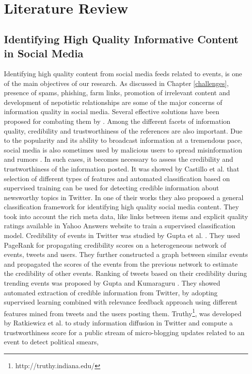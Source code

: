 
\chapter{Literature Review} %
\thispagestyle{fancy}
\label{review} %

\doublespacing
\setlength{\parindent}{1cm}
\section{Identifying High Quality Informative Content in Social Media}
Identifying high quality content from social media feeds related to events, is one of the main objectives of our research. As discussed in Chapter \ref{challenges}, presence of spams, phishing, farm links, promotion of irrelevant content and development of nepotistic relationships are some of the major concerns of information quality in social media. Several effective solutions have been proposed for combating them by \cite{benevenuto2010detecting,chhabra2011phi,grier2010spam,yardi2009detecting}. Among the different facets of information quality, credibility and trustworthiness of the references are also important.  Due to the popularity and its ability to broadcast information at a tremendous pace, social media is also sometimes used by malicious users to spread misinformation and rumors \cite{tonkin2012twitter}. In such cases, it becomes necessary to assess the credibility and trustworthiness of the information posted. It was showed by Castillo et al. \cite{castillo2011information} that selection of different types of features and automated classification based on supervised training can be used for detecting credible information about newsworthy topics in Twitter. In one of their works \cite{agichtein2008finding} they also proposed a general classification framework for identifying high quality social media content. They took into account the rich meta data, like links between items and explicit quality ratings available in Yahoo Answers website to train a supervised classification model. Credibility of events in Twitter was studied by Gupta et al. \cite{gupta2012evaluating}. They used PageRank for propagating credibility scores on a heterogeneous network of events, tweets and users. They further constructed a graph between similar events and propagated the scores of the events from the previous network to estimate the credibility of other events. Ranking of tweets based on their credibility during trending events was proposed by Gupta and Kumaraguru \cite{gupta2012credibility}. They showed automated extraction of credible information from Twitter, by adopting supervised learning combined with relevance feedback approach using different features mined from tweets and the users posting them. Truthy\footnote{http://truthy.indiana.edu/}, was developed by Ratkiewicz et al. to study information diffusion in Twitter and compute a trustworthiness score for a public stream of micro-blogging updates related to an event to detect political smears, 